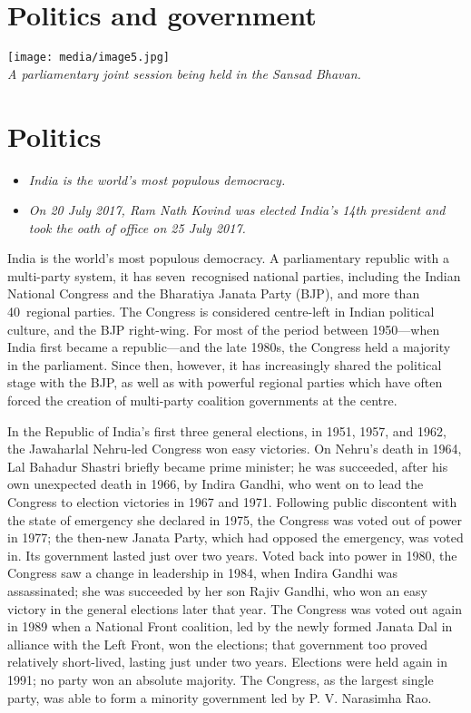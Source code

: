 \section{Politics and government}\label{politics-and-government}

\texttt{[image: media/image5.jpg]}\\
\emph{A parliamentary joint session being held in the Sansad Bhavan.}

\section{Politics}\label{politics}

\begin{itemize}
\item
  \emph{India is the world's most populous democracy.}
\item
  \emph{On 20 July 2017, Ram Nath Kovind was elected India's 14th
  president and took the oath of office on 25 July 2017.}
\end{itemize}

India is the world's most populous democracy. A parliamentary republic
with a multi-party system, it has seven~recognised national parties,
including the Indian National Congress and the Bharatiya Janata Party
(BJP), and more than 40~regional parties. The Congress is considered
centre-left in Indian political culture, and the BJP right-wing. For
most of the period between 1950---when India first became a
republic---and the late 1980s, the Congress held a majority in the
parliament. Since then, however, it has increasingly shared the
political stage with the BJP, as well as with powerful regional parties
which have often forced the creation of multi-party coalition
governments at the centre.

In the Republic of India's first three general elections, in 1951, 1957,
and 1962, the Jawaharlal Nehru-led Congress won easy victories. On
Nehru's death in 1964, Lal Bahadur Shastri briefly became prime
minister; he was succeeded, after his own unexpected death in 1966, by
Indira Gandhi, who went on to lead the Congress to election victories in
1967 and 1971. Following public discontent with the state of emergency
she declared in 1975, the Congress was voted out of power in 1977; the
then-new Janata Party, which had opposed the emergency, was voted in.
Its government lasted just over two years. Voted back into power in
1980, the Congress saw a change in leadership in 1984, when Indira
Gandhi was assassinated; she was succeeded by her son Rajiv Gandhi, who
won an easy victory in the general elections later that year. The
Congress was voted out again in 1989 when a National Front coalition,
led by the newly formed Janata Dal in alliance with the Left Front, won
the elections; that government too proved relatively short-lived,
lasting just under two years. Elections were held again in 1991; no
party won an absolute majority. The Congress, as the largest single
party, was able to form a minority government led by P. V. Narasimha
Rao.

